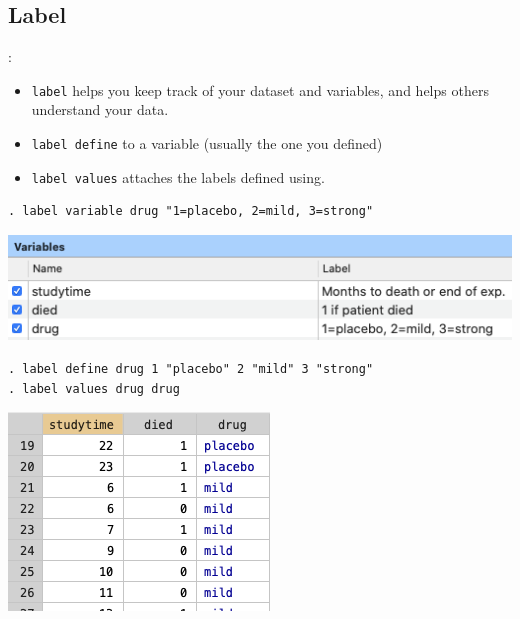 \subsection{Label}
\begin{frame}[fragile]{\secname : \subsecname}
\begin{itemize}
	\item 	\verb|label| helps you keep track of your dataset and variables, and helps others understand your data. 
	\item \verb|label define| to a variable (usually the one you defined)
	\item \verb|label values| attaches the labels defined using. 
\end{itemize}

\small
\begin{verbatim}
. label variable drug "1=placebo, 2=mild, 3=strong"
\end{verbatim}

\begin{center}
	\includegraphics[scale=0.4]{image/label_var}
\end{center}


\begin{verbatim}
. label define drug 1 "placebo" 2 "mild" 3 "strong"
. label values drug drug
\end{verbatim}
\begin{center}
	\includegraphics[scale=0.3]{image/label_def}
\end{center}
\end{frame}


